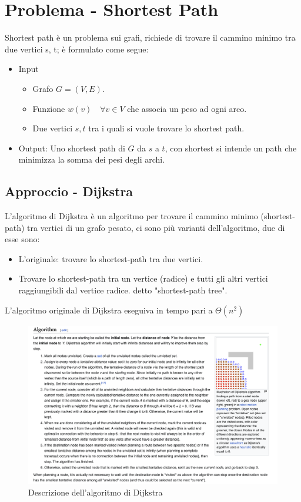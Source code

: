 \documentclass[12pt,a4paper]{article}
\begin{document}
\pagebreak
\section{Problema - Shortest Path}
Shortest path è un problema sui grafi, richiede di trovare il cammino minimo tra due vertici s, t; è formulato come segue:
\begin{itemize}
\item Input
\begin{itemize}
\item Grafo $G = (V, E)$.
\item Funzione $w(v) \quad \forall v \in V$ che associa un peso ad ogni arco.
\item Due vertici $s, t$ tra i quali si vuole trovare lo shortest path.
\end{itemize}
\item Output: Uno shortest path di $G$ da $s$ a $t$, con shortest si intende un path che minimizza la somma dei pesi degli archi.
\end{itemize}

\subsection{Approccio - Dijkstra}
L'algoritmo di Dijkstra è un algoritmo per trovare il cammino minimo (shortest-path) tra vertici di un grafo pesato, ci sono più varianti dell'algoritmo, due di esse sono:
\begin{itemize}
\item L'originale: trovare lo shortest-path tra due vertici.

\item Trovare lo shortest-path tra un vertice (radice) e tutti gli altri vertici raggiungibili dal vertice radice. detto "shortest-path tree".
\end{itemize}
L'algoritmo originale di Dijkstra eseguiva in tempo pari a $\Theta(n^{2})$

\begin{figure}[h]
	\centering
	\includegraphics[width=0.9\linewidth]{img/Short_path}
	\caption{Descrizione dell'algoritmo di Dijkstra}
	\label{fig:Dijkstra algorithm}
\end{figure}
\end{document}
